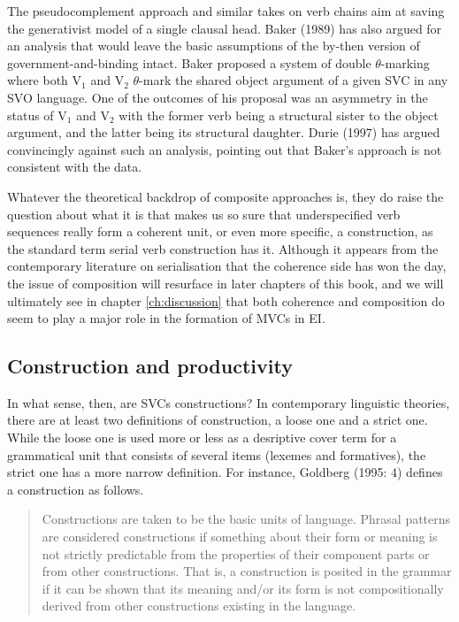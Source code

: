 The pseudocomplement approach and similar takes on verb chains aim at saving the generativist model of a single clausal head. Baker (1989) has also argued for an analysis that would leave the basic assumptions of the by-then version of government-and-binding intact. Baker proposed a system of double $\theta$-marking where both V$_1$ and V$_2$ $\theta$-mark the shared object argument of a given SVC in any SVO language. One of the outcomes of his proposal was an asymmetry in the status of V$_1$ and V$_2$ with the former verb being a structural sister to the object argument, and the latter being its structural daughter. Durie (1997) has argued convincingly against such an analysis, pointing out that Baker's approach is not consistent with the data.

Whatever the theoretical backdrop of composite approaches is, they do raise the question about what it is that makes us so sure that underspecified verb sequences really form a coherent unit, or even more specific, a construction, as the standard term serial verb construction has it. Although it appears from the contemporary literature on serialisation that the coherence side has won the day, the issue of composition will resurface in later chapters of this book, and we will ultimately see in chapter \ref{ch:discussion} that both coherence and composition do seem to play a major role in the formation of MVCs in EI.

\subsection{Construction and productivity}

In what sense, then, are SVCs constructions? In contemporary linguistic theories, there are at least two definitions of construction, a loose one and a strict one. While the loose one is used more or less as a desriptive cover term for a grammatical unit that consists of several items (lexemes and formatives), the strict one has a more narrow definition. For instance, Goldberg (1995: 4) defines a construction as follows. 

\begin{quote}Constructions are taken to be the basic units of language. Phrasal patterns are considered constructions if something about their form or meaning is not strictly predictable from the properties of their component parts or from other constructions. That is, a construction is posited in the grammar if it can be shown that its meaning and/or its form is not compositionally derived from other constructions existing in the language.\end{quote}

